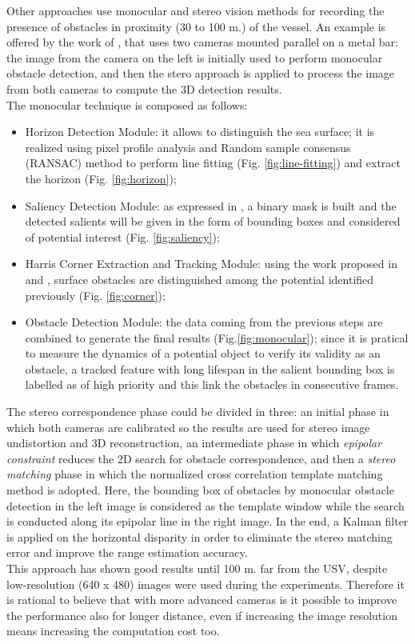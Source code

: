 \documentclass[12pt]{article}
\begin{document}
      \indent Other approaches use monocular and stereo vision methods for recording the presence of obstacles in proximity (30 to 100 m.) of the vessel. An example is offered by the work of \textcite{Wang2011,Wang2012}, that uses two cameras mounted parallel on a metal bar: the image from the camera on the left is initially used to perform monocular obstacle detection, and then the stero approach is applied to process the image from both cameras to compute the 3D detection results.\\
      The monocular technique is composed as follows:
            \begin{itemize}
                  \item Horizon Detection Module: it allows to distinguish the sea surface; it is realized using pixel profile analysis and Random sample consensus (RANSAC) \parencite{Fischler1981} method to perform line fitting (Fig. \ref{fig:line-fitting}) and extract the horizon (Fig. \ref{fig:horizon});
                  \item Saliency Detection Module: as expressed in \parencite{Achanta2009}, a binary mask is built and the detected salients will be given in the form of bounding boxes and considered of potential interest (Fig. \ref{fig:saliency});
                  \item Harris Corner Extraction and Tracking Module: using the work proposed in \parencite{Harris1988} and \parencite{Bouguet1999}, surface obstacles are distinguished among the potential identified previously (Fig. \ref{fig:corner});
                  \item Obstacle Detection Module: the data coming from the previous steps are combined to generate the final results (Fig.\ref{fig:monocular}); since it is pratical to measure the dynamics of a potential object to verify its validity as an obstacle, a tracked feature with long lifespan in the salient bounding box is labelled as of high priority and this link the obstacles in consecutive frames.
            \end{itemize}
      \indent The stereo correspondence phase could be divided in three: an initial phase in which both cameras are calibrated so the results are used for stereo image undistortion and 3D reconstruction, an intermediate phase in which \textit{epipolar constraint} reduces the 2D search for obstacle correspondence, and then a \textit{stereo matching} phase in which the normalized cross correlation template matching method is adopted. Here, the bounding box of obstacles by monocular obstacle detection in the left image is considered as the template window while the search is conducted along its epipolar line in the right image. In the end, a Kalman filter is applied on the horizontal disparity in order to eliminate the stereo matching error and improve the range estimation accuracy.\\
      This approach has shown good results until 100 m. far from the USV, despite low-resolution (640 x 480) images were used during the experiments. Therefore it is rational to believe that with more advanced cameras is it possible to improve the performance also for longer distance, even if increasing the image resolution means increasing the computation cost too.
\end{document}
